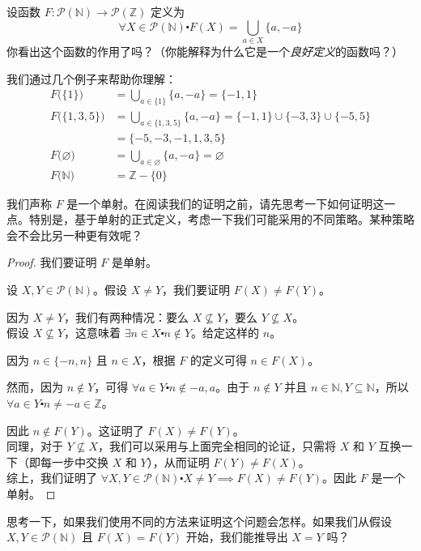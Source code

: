 \begin{example}
    设函数 $F : \mathcal{P}(\mathbb{N}) \to \mathcal{P}(\mathbb{Z})$ 定义为
    \[\forall X \in \mathcal{P}(\mathbb{N}) \centerdot F(X) = \bigcup_{a \in X} \{a, -a\}\]
    你看出这个函数的作用了吗？（你能解释为什么它是一个\emph{良好定义}的函数吗？）

    我们通过几个例子来帮助你理解：
    \begin{align*}
        F\big(\{1\}\big)       & = \bigcup_{a \in \{1\}} \{a, -a\} = \{-1,1\}                                 \\
        F\big(\{1,3,5\}\big)   & = \bigcup_{a \in \{1,3,5\}} \{a, -a\} = \{-1,1\} \cup \{-3,3\} \cup \{-5,5\} \\
                               & = \{-5,-3,-1,1,3,5\}                                                         \\
        F\big(\varnothing\big) & = \bigcup_{a \in \varnothing} \{a, -a\} = \varnothing                        \\
        F\big(\mathbb{N}\big)  & = \mathbb{Z} - \{0\}
    \end{align*}

    我们声称 $F$ 是一个单射。在阅读我们的证明之前，请先思考一下如何证明这一点。特别是，基于单射的正式定义，考虑一下我们可能采用的不同策略。某种策略会不会比另一种更有效呢？

    \begin{proof}
        我们要证明 $F$ 是单射。

        设 $X,Y \in \mathcal{P}(\mathbb{N})$。假设 $X \ne Y$，我们要证明 $F(X) \ne F(Y)$。

        因为 $X \ne Y$，我们有两种情况：要么 $X \nsubseteq Y$，要么 $Y \nsubseteq X$。\\

        假设 $X \nsubseteq Y$，这意味着 $\exists n \in X \centerdot n \notin Y$。给定这样的 $n$。

        因为 $n \in \{-n, n\}$ 且 $n \in X$，根据 $F$ 的定义可得 $n \in F(X)$。

        然而，因为 $n \notin Y$，可得 $\forall a \in Y \centerdot n \notin {-a, a}$。由于 $n \notin Y$ 并且 $n \in \mathbb{N}, Y \subseteq \mathbb{N}$，所以 $\forall a \in Y \centerdot n \ne -a \in \mathbb{Z}$。

        因此 $n \notin F(Y)$。这证明了 $F(X) \ne F(Y)$。\\

        同理，对于 $Y \nsubseteq X$，我们可以采用与上面完全相同的论证，只需将 $X$ 和 $Y$ 互换一下（即每一步中交换 $X$ 和 $Y$），从而证明 $F(Y) \ne F(X)$。\\

        综上，我们证明了 $\forall X, Y \in \mathcal{P}(\mathbb{N}) \centerdot X \ne Y \implies F(X) \ne F(Y)$。因此 $F$ 是一个单射。
    \end{proof}

    思考一下，如果我们使用不同的方法来证明这个问题会怎样。如果我们从假设 $X, Y \in \mathcal{P}(\mathbb{N})$ 且 $F(X) = F(Y)$ 开始，我们能推导出 $X = Y$ 吗？
\end{example}